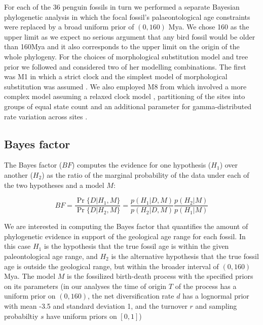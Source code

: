 \documentclass[11pt]{article}
\newcommand{\Mstrict}{{M1}}
\newcommand{\Mrelaxed}{{M8}}
\begin{document}
For each of the 36 penguin fossils in turn we performed a separate Bayesian phylogenetic analysis in which the focal fossil's palaeontological age constraints were replaced by a broad uniform prior of $(0,160)$ Mya. We chose 160 as the upper limit as we expect no serious argument that any bird fossil would be older than 160Mya and it also corresponds to the upper limit on the origin of the whole phylogeny. For the choices of morphological substitution model and tree prior we followed \textcite{gavryushkina2015bayesian} and considered two of her modelling combinations. The first was \Mstrict{} in which a strict clock and the simplest model of morphological substitution was assumed \autocite{Lewis2001}. We also employed \Mrelaxed{} from \textcite{gavryushkina2015bayesian} which involved a more complex model assuming a relaxed clock model \autocite{Drummond2006}, partitioning of the sites into groups of equal state count and an additional parameter for gamma-distributed rate variation across sites \autocite{yang:1994ma}.

\subsection*{Bayes factor}

The Bayes factor ($BF$) computes the evidence for one hypothesis ($H_1$) over another ($H_2$) as the ratio of the marginal probability of the data under each of the two hypotheses and a model $M$:

\begin{equation}
BF = \frac{\Pr\{D|H_1,M\}}{\Pr\{D|H_2,M\}} = \frac{p(H_1|D,M)}{p(H_2|D,M)}\frac{p(H_2|M)}{p(H_1|M)}
\end{equation}

We are interested in computing the Bayes factor that quantifies the amount of phylogenetic evidence in support of the geological age range for each fossil. In this case $H_1$ is the hypothesis that the true fossil age is within the given paleontological age range, and $H_2$ is the alternative hypothesis that the true fossil age is outside the geological range, but within the broader interval of $(0,160)$ Mya. The model $M$ is the fossilized birth-death process with the specified priors on its parameters (in our analyses the time of origin $T$ of the process has a uniform prior on $(0,160)$, the net diversification rate $d$ has a lognormal prior with mean -3.5 and standard deviation 1, and the turnover $r$ and sampling probabiltiy $s$ have uniform priors on $[0,1]$)
\end{document}
